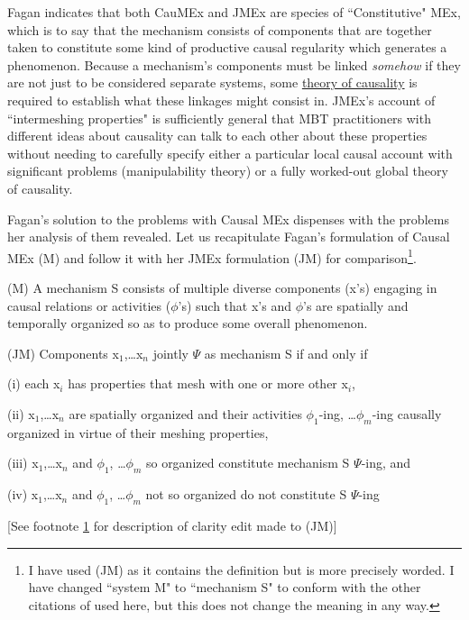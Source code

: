  Fagan indicates that both CauMEx and JMEx are species of ``Constitutive" MEx, which is to say that the mechanism consists of components that are together taken to constitute some kind of productive causal regularity which generates a phenomenon. Because a mechanism's components must be linked \textit{somehow} if they are not just to be considered separate systems, some \hyperref[causality]{theory of causality} is required to establish what these linkages might consist in. JMEx's account of ``intermeshing properties" is sufficiently general that MBT practitioners with different ideas about causality can talk to each other about these properties without needing to carefully specify either a particular local causal account with significant problems (manipulability theory) or a fully worked-out global theory of causality.

Fagan's solution to the problems with Causal MEx dispenses with the problems her analysis of them revealed. Let us recapitulate Fagan's formulation of Causal MEx (M) and follow it with her JMEx formulation (JM) for comparison\footnote{\label{ftn:JMedits}I have used \cite{Fagan2015} (JM) as it contains the \cite{Fagan2013} definition but is more precisely worded. I have changed ``system M" to ``mechanism S" to conform with the other citations of \cite{Fagan2013} used here, but this does not change the meaning in any way.}.

\begin{longquote}
(M) A mechanism S consists of multiple diverse components (x's) engaging in causal relations or activities ($\phi$'s) such that x's and $\phi$'s are 
spatially and temporally organized so as to produce some overall
phenomenon.
\cite[p.95]{Fagan2013}
\end{longquote}

\begin{longquote}
(JM) Components x$_1$,\ldots x$_n$ jointly $\Psi$ as mechanism S if and only if


(i) each x$_i$ has properties that mesh with one or more other x$_i$,

(ii) x$_1$,\ldots x$_n$ are spatially organized and their activities $\phi_1$-ing, \ldots $\phi_m$-ing causally organized in virtue of their meshing
properties,

(iii) x$_1$,\ldots x$_n$ and $\phi_1$, \ldots $\phi_m$ so organized constitute mechanism S $\Psi$-ing, and

(iv) x$_1$,\ldots x$_n$ and $\phi_1$, \ldots $\phi_m$ not so organized do not constitute S $\Psi$-ing

[See footnote \ref{ftn:JMedits} for description of clarity edit made to (JM)]
\cite{Fagan2015}
\end{longquote}

